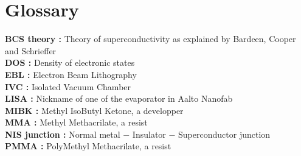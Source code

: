 \pagestyle{fancy}
\chapter*{Glossary}
\textbf{BCS theory : }Theory of superconductivity as explained by Bardeen, Cooper and Schrieffer\\
\textbf{DOS :} Density of electronic states\\
\textbf{EBL :} Electron Beam Lithography\\
\textbf{IVC :} Isolated Vacuum Chamber\\
\textbf{LISA :} Nickname of one of the evaporator in Aalto Nanofab\\
\textbf{MIBK :} Methyl IsoButyl Ketone, a developper\\
\textbf{MMA : } Methyl Methacrilate, a resist\\
\textbf{NIS junction :} Normal metal $-$ Insulator $-$ Superconductor junction\\
\textbf{PMMA :} PolyMethyl Methacrilate, a resist\\
